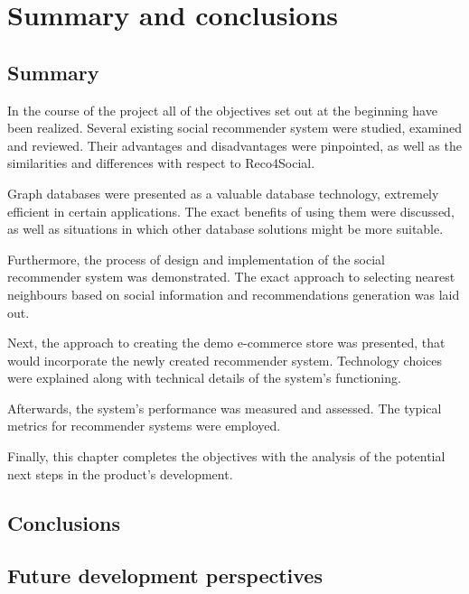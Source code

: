 \documentclass[12pt]{report}
\begin{document}



\chapter{Summary and conclusions}
\label{ch.summary}
\section{Summary}

In the course of the project all of the objectives set out at the beginning have been realized. Several existing social recommender system were studied, examined and reviewed. Their advantages and disadvantages were pinpointed, as well as the similarities and differences with respect to Reco4Social.

Graph databases were presented as a valuable database technology, extremely efficient in certain applications. The exact benefits of using them were discussed, as well as situations in which other database solutions might be more suitable.

Furthermore, the process of design and implementation of the social recommender system was demonstrated. The exact approach to selecting nearest neighbours based on social information and recommendations generation was laid out.

Next, the approach to creating the demo e-commerce store was presented, that would incorporate the newly created recommender system. Technology choices were explained along with technical details of the system's functioning.

Afterwards, the system's performance was measured and assessed. The typical metrics for recommender systems were employed.

Finally, this chapter completes the objectives with the analysis of the potential next steps in the product's development.

\section{Conclusions}



\section{Future development perspectives}
\end{document}
